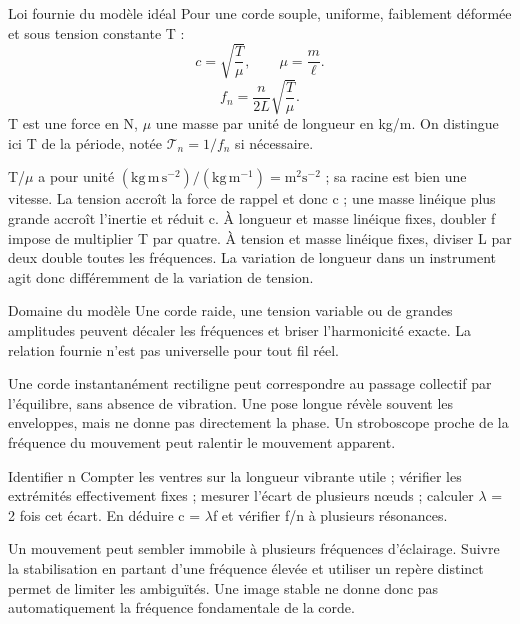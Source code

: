\begin{loi}{Loi fournie du modèle idéal}
Pour une corde souple, uniforme, faiblement déformée et sous tension constante T :\[c=\sqrt{\frac T\mu},\qquad\mu=\frac m\ell.\]\[f_n=\frac n{2L}\sqrt{\frac T\mu}.\]T est une force en N, \ensuremath{\mu} une masse par unité de longueur en kg/m. On distingue ici T de la période, notée $\mathcal T_n=1/f_n$ si nécessaire.
\end{loi}
T/\ensuremath{\mu} a pour unité $(\mathrm{kg\,m\,s^{-2}})/(\mathrm{kg\,m^{-1}})=\mathrm{m^2s^{-2}}$ ; sa racine est bien une vitesse. La tension accroît la force de rappel et donc c ; une masse linéique plus grande accroît l’inertie et réduit c.
À longueur et masse linéique fixes, doubler f impose de multiplier T par quatre. À tension et masse linéique fixes, diviser L par deux double toutes les fréquences. La variation de longueur dans un instrument agit donc différemment de la variation de tension.
\begin{docu}{Domaine du modèle}
Une corde raide, une tension variable ou de grandes amplitudes peuvent décaler les fréquences et briser l’harmonicité exacte. La relation fournie n’est pas universelle pour tout fil réel.
\end{docu}


Une corde instantanément rectiligne peut correspondre au passage collectif par l’équilibre, sans absence de vibration. Une pose longue révèle souvent les enveloppes, mais ne donne pas directement la phase. Un stroboscope proche de la fréquence du mouvement peut ralentir le mouvement apparent.
\begin{methode}{Identifier n}
Compter les ventres sur la longueur vibrante utile ; vérifier les extrémités effectivement fixes ; mesurer l’écart de plusieurs nœuds ; calculer \ensuremath{\lambda} = 2 fois cet écart. En déduire c = \ensuremath{\lambda}f et vérifier f/n à plusieurs résonances.
\end{methode}
Un mouvement peut sembler immobile à plusieurs fréquences d’éclairage. Suivre la stabilisation en partant d’une fréquence élevée et utiliser un repère distinct permet de limiter les ambiguïtés. Une image stable ne donne donc pas automatiquement la fréquence fondamentale de la corde.


